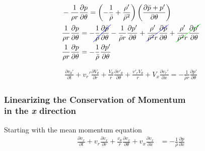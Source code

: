 \begin{align*}
&
-\frac{1}{\rho r}\frac{\partial p}{\partial \theta} = \left( -\frac{1    }{\bar{\rho}} +
\frac{\rho'}{\bar{\rho}^2}\right) \left(\frac{\partial \bar{p} + p'}{\partial \theta}\right)\\
&\frac{1}{\rho r}\frac{\partial p}{\partial \theta} =  -\Ccancel[blue]{\frac{1    }{\bar{\rho}}  \frac{\partial \bar{p}}{\partial \theta}} -  
\frac{1    }{\bar{\rho} r}  \frac{\partial p'}{\partial \theta} +
\Ccancel[blue]{\frac{\rho'}{\bar{\rho}^2 r}\frac{\partial \bar{p}}{\partial \theta}} +
\Ccancel[green]{\frac{\rho'}{\bar{\rho}^2 r}\frac{\partial p'}{\partial \theta}}\\
&\frac{1}{\rho r}\frac{\partial p}{\partial \theta} =  -\frac{1    }{\bar{\rho}}  \frac{\partial p'}{\partial \theta} 
\end{align*}

\begin{align*}
\boxed{
	\frac{\partial  v_{\theta}' }{\partial t} +
	v_r' \frac{\partial  V_{\theta}  }{\partial r} +
	\frac{V_{\theta}}{r} \frac{\partial v'_{\theta}}{\partial \theta} +
	\frac{v'_rV_{\theta}}{r} +
	V_x \frac{\partial v_r'}{\partial x} 
	= -\frac{1}{\bar{\rho} r}	\frac{\partial p'}{\partial \theta}
}
\end{align*}
\newpage
\subsubsection{Linearizing the Conservation of Momentum\\ in the \textit{x} direction}
Starting with the mean momentum equation 
\begin{align*}
\frac{\partial v_{x}}{\partial t} + 
v_r 
\frac{\partial v_x}{\partial r} +
\frac{v_{\theta}}{r}
\frac{\partial v_x}{\partial \theta}+ 
v_x \frac{\partial v_x}{\partial x} 
&= 
-\frac{1}{\rho } 
\frac{\partial p}{\partial x}
\end{align*}


